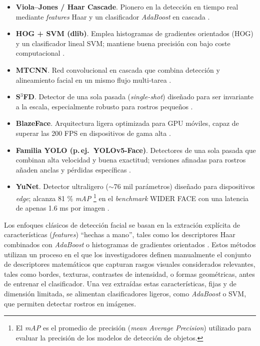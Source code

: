\begin{itemize}
  \item \textbf{Viola--Jones / Haar Cascade}.  
        Pionero en la detección en tiempo real mediante \emph{features} Haar y un clasificador \emph{AdaBoost} en cascada \cite{viola_jones_2001}.

  \item \textbf{HOG + SVM (dlib)}.  
        Emplea histogramas de gradientes orientados (HOG) y un clasificador lineal SVM; mantiene buena precisión con bajo coste computacional \cite{dalal_triggs_2005}.

  \item \textbf{MTCNN}.  
        Red convolucional en cascada que combina detección y alineamiento facial en un mismo flujo multi-tarea \cite{zhang_mtcnn_2016}.

  \item \textbf{S$^3$FD}.  
        Detector de una sola pasada (\emph{single-shot}) diseñado para ser invariante a la escala, especialmente robusto para rostros pequeños \cite{zhang_s3fd_2017}.

  \item \textbf{BlazeFace}.  
        Arquitectura ligera optimizada para GPU móviles, capaz de superar las 200 FPS en dispositivos de gama alta \cite{bazarevsky_blazeface_2019}.

  \item \textbf{Familia YOLO (p.\,ej.\ YOLOv5-Face)}.  
        Detectores de una sola pasada que combinan alta velocidad y buena exactitud; versiones afinadas para rostros añaden anclas y pérdidas específicas \cite{redmon_yolo_2016}.

  \item \textbf{YuNet}.  
        Detector ultraligero ($\sim$76 mil parámetros) diseñado para dispositivos \emph{edge}; alcanza 81 \% \textit{mAP} \footnote{El \textit{mAP} es el promedio de precisión (\textit{mean Average Precision}) utilizado para evaluar la precisión de los modelos de detección de objetos.} en el \textit{benchmark} WIDER FACE con una latencia de apenas 1.6 ms por imagen \cite{wu_yunet_2023}.

\end{itemize}

Los enfoques clásicos de detección facial se basan en la extración explícita de características (\textit{features}) ``hechas a mano'', tales como los descriptores Haar combinados con \textit{AdaBoost} \cite{viola_jones_2001} o histogramas de gradientes orientados  \cite{dalal_triggs_2005}. Estos métodos utilizan un proceso en el que los investigadores definen manualmente el conjunto de descriptores matemáticos que capturan rasgos visuales considerados relevantes, tales como bordes, texturas, contrastes de intensidad, o formas geométricas, antes de entrenar el clasificador. Una vez extraídas estas características, fijas y de dimensión limitada, se alimentan clasificadores ligeros, como \textit{AdaBoost} o SVM, que permiten detectar rostros en imágenes.

